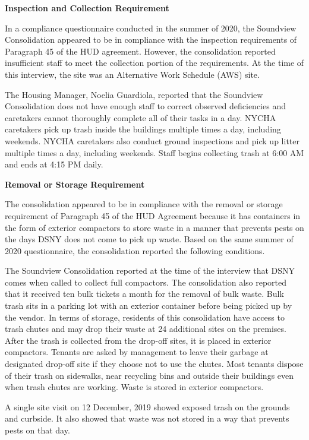 
\textbf{Inspection and Collection Requirement}

In a compliance questionnaire conducted in the summer of 2020, the Soundview Consolidation appeared to be in compliance with the inspection requirements of Paragraph 45 of the HUD agreement. However, the consolidation reported insufficient staff to meet the collection portion of the requirements. At the time of this interview, the site was an Alternative Work Schedule (AWS) site. 

The Housing Manager, Noelia Guardiola, reported that the Soundview Consolidation does not have enough staff to correct observed deficiencies and caretakers cannot thoroughly complete all of their tasks in a day. NYCHA caretakers pick up trash inside the buildings multiple times a day, including weekends. NYCHA caretakers also conduct ground inspections and pick up litter multiple times a day, including weekends. Staff begins collecting trash at 6:00 AM and ends at 4:15 PM daily. 

\textbf{Removal or Storage Requirement}

The consolidation appeared to be in compliance with the  removal or storage requirement of Paragraph  45 of the HUD Agreement because it has containers in the form of exterior compactors to store waste in a manner that prevents pests on the days DSNY does not come to pick up waste. Based on the same summer of 2020 questionnaire, the consolidation reported the following conditions.

The Soundview Consolidation reported at the time of the interview that DSNY comes when called to collect full compactors. The consolidation also reported that it received ten bulk tickets a month for the removal of bulk waste. Bulk trash sits in a parking lot with an exterior container before being picked up by the vendor. In terms of storage, residents of this consolidation have access to trash chutes and may drop their waste at 24 additional sites on the premises. After the trash is collected from the drop-off sites, it is placed in exterior compactors. Tenants are asked by management to leave their garbage at designated drop-off site if they choose not to use the chutes. Most tenants dispose of their trash on sidewalks, near recycling bins and outside their buildings even when trash chutes are working. Waste is stored in exterior compactors. 

A single site visit on 12 December, 2019 showed exposed trash on the grounds and curbside. It also showed that waste was not stored in a way that prevents pests on that day. 

